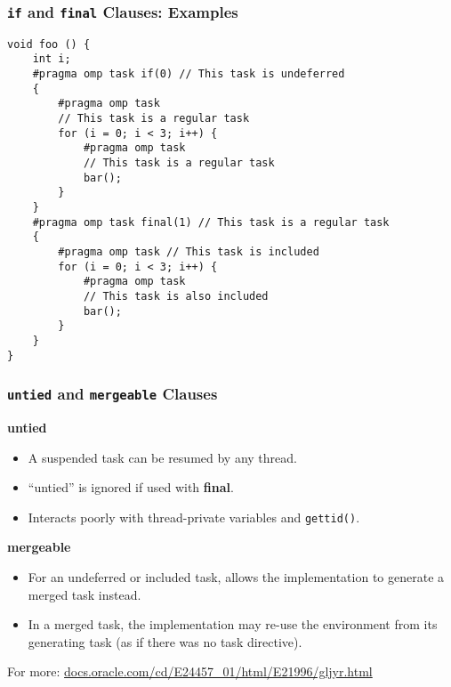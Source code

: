 \begin{frame}[fragile]
  \frametitle{{\tt if} and {\tt final} Clauses: Examples}

  \begin{lstlisting}
void foo () {
    int i;
    #pragma omp task if(0) // This task is undeferred
    {
        #pragma omp task
        // This task is a regular task
        for (i = 0; i < 3; i++) {
            #pragma omp task
            // This task is a regular task
            bar();
        }
    }
    #pragma omp task final(1) // This task is a regular task
    {
        #pragma omp task // This task is included
        for (i = 0; i < 3; i++) {
            #pragma omp task
            // This task is also included
            bar();
        }
    }
}
  \end{lstlisting}
\end{frame}

\begin{frame}
  \frametitle{{\tt untied} and {\tt mergeable} Clauses}

  
\begin{center}
  {\bf untied}
\end{center}
  \begin{itemize}
    \item A suspended task can be resumed by any thread.
    \item ``untied'' is ignored if used with {\bf final}.
    \item Interacts poorly with thread-private variables and {\tt gettid()}.
  \end{itemize}

\begin{center}
  {\bf mergeable}
\end{center}

  \begin{itemize}
    \item For an undeferred or included task,
    allows the implementation to generate a merged task instead.
    \item In a merged task, the implementation may re-use the environment from its generating task (as if there was no task directive).
  \end{itemize}

  For more: \url{docs.oracle.com/cd/E24457_01/html/E21996/gljyr.html}
  
\end{frame}

